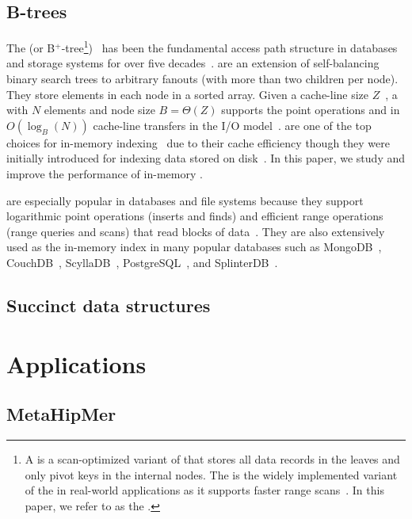 \subsection{B-trees}

The \btree(or B$^+$-tree\footnote{A \bplustree is a scan-optimized variant of
\btrees that stores all data records in the leaves and only pivot keys in the
internal nodes. The \bplustree is the widely implemented variant of the \btree
in real-world applications as it supports faster range
scans~\cite{mongodb,couchdb,scylladb,conway2020splinterdb,postgresql}. In this
paper, we refer to \bplustree as the \btree.})~\cite{BayerMc72} has been the
fundamental access path structure in databases and storage systems for over five
decades~\cite{Comer79,graefe2010survey}. \btrees are an extension of
self-balancing binary search trees to arbitrary fanouts (with more than two
children per node). They store elements in each node in a sorted array.  Given a
cache-line size $Z$~\cite{AggarwalVi88}, a \btree with $N$ elements and node
size $B = \Theta(Z)$ supports the point operations  and 
in $O(\log_B(N))$ cache-line transfers in the I/O model~\cite{AggarwalVi88}.
\btrees are one of the top choices for in-memory indexing~\cite{ZhangChOo15} due
to their cache efficiency though they were initially introduced for indexing
data stored on disk~\cite{BayerMc72}. In this paper, we study and improve the
performance of in-memory \btrees.

\btrees are especially popular in databases and file systems because they
support logarithmic point operations (inserts and finds) and efficient range
operations (range queries and scans) that read blocks of
data~\cite{Knuth98,rodeh2013btrfs}.  They are also extensively used as the
in-memory index in many popular databases such as MongoDB~\cite{mongodb},
CouchDB~\cite{couchdb}, ScyllaDB~\cite{scylladb}, PostgreSQL~\cite{postgresql},
and SplinterDB~\cite{conway2020splinterdb}.

\subsection{Succinct data structures}


\section{Applications}

\subsection{MetaHipMer}

